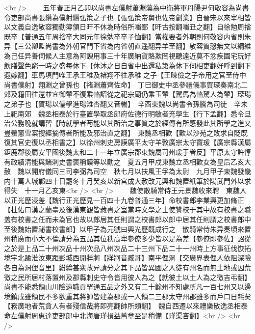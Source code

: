 <br />
　　五年春正月乙卯以尚書左僕射蕭淵藻為中衛將軍丹陽尹何敬容為尚書令吏部尚書張纘為僕射纘弘策之子也【張弘策帝舅也佐帝創業】自晉宋以來宰相皆以文義自逸敬容獨勤簿領日旰不休為時俗所嗤鄙【旰古按翻嗤丑之翻】自徐勉周捨既卒【普通五年周捨卒大同元年徐勉卒卒子恤翻】當權要者外朝則何敬容内省則朱异【三公卿監尚書為外朝官門下省為内省朝直遥翻异羊至翻】敬容質慤無文以綱維為己任异善伺候人主意為阿諛用事三十年廣納貨賂欺罔視聽遠近莫不忿疾園宅玩好飲膳聲色窮一時之盛每休下【休沐之日自省中出還私第為休下伺相吏翻好呼到翻下遐嫁翻】車馬填門唯王承王稚及褚翔不往承稚之子【王暕儉之子帝用之官至侍中尚書僕射】翔淵之曾孫也【禇淵蕭齊佐命】　丁巳御史中丞參禮儀事賀琛奏南北二郊及籍田往還並宜御輦不復乘輅詔從之祀宗廟仍乘玉輦【駕馬為輅駕人為輦】琛瑒之弟子也【賀瑒以儒學進瑒雉杏翻又音暢】　辛酉東魏以尚書令孫騰為司徒　辛未上祀南郊　魏丞相泰於行臺置學取丞郎府佐德行明敏者充學生【行下孟翻】悉令旦治公務晚就講習【時就學者苟能以其所治之事質之於經傳有所感發此其所學之進又豈螢窻雪案搜經摘傳者所能及邪治直之翻】　東魏丞相歡【歡以沙苑之敗求自貶既復其官史復以丞相書之】以徐州刺史房謨廣平太守羊敦廣宗太守竇瑗【廣宗縣漢屬鉅鹿郡後屬安平國後魏太和二十一年立廣宗郡東魏屬司州瑗于眷反】平原太守許惇有政績清能與諸刺史書褒稱謨等以勸之　夏五月甲戍東魏立丞相歡女為皇后乙亥大赦　魏以開府儀同三司李弼為司空　秋七月以扶風王孚為太尉　九月甲子東魏發畿内十萬人城鄴四十日罷冬十月癸亥以新宫成大赦改元興和魏置紙筆於陽武門外以求得失　十一月乙亥東<br />
<br />
　　魏使散騎常侍王元景魏收來聘　東魏人以正光歷浸差【魏行正光歷見一百四十九卷普通三年】命校書郎李業興更加脩正【杜佑曰漢之蘭臺及後漢東觀皆藏書之室當時文學之士使讐校于其中故有校書之職盖有校書之任而未為官也故以郎居其任則謂之校書郎以郎中居其任則謂之校書郎中至後魏始置祕書校書郎】以甲子為元號曰興光歷既成行之　散騎常侍朱异奏頃來置州稍廣而小大不倫請分為五品其位秩高卑參僚多少皆以是為差【參僚即參佐】詔從之於是上品二十州次品十州次品八州次品二十三州下品二十一州時上方事征伐恢拓境宇北踰淮汝東距彭城西開牂牁【牂牁音臧哥】南平俚洞【交廣界表俚人依阻深險各自為洞俚音里】紛綸甚衆故异請分之其下品皆異國之人徒有州名而無土地或因荒徼之民所居村落置州及郡縣刺史守令皆用彼人為之【就彼土以土人為之徼吉弔翻】尚書不能悉領山川險遠職貢罕通五品之外又有二十餘州不知處所凡一百七州又以邊境鎮戌雖領民不多欲重其將帥皆建為郡或一人領二三郡太守州郡雖多而戶口日耗矣【務廣地者荒貪人有者殘信哉將即亮翻帥所類翻】　魏自西遷以來禮樂散逸丞相泰命左僕射周惠達吏部郎中北海唐瑾損益舊章至是稍備【瑾渠吝翻】<br />
<br />
